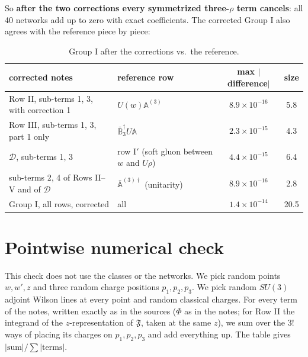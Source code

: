 \documentclass[10pt]{article}
\numberwithin{equation}{section}
\begin{document}
\medskip
So \textbf{after the two corrections every symmetrized three-$\rho$ term cancels}: all 40 networks add up to zero with exact coefficients. The corrected Group I also agrees with the reference piece by piece:

\begin{table}[h]
\centering\small
\begin{tabular}{@{}l l c c@{}}
corrected notes & reference row & max $|$difference$|$ & size\\ \hline
Row II, sub-terms 1, 3, with correction 1 & $U(w)\mathbb A^{(3)}$ & $8.9\times10^{-16}$ & 5.8\\
Row III, sub-terms 1, 3, part 1 only & $\bar{\mathbb B}_3^\dagger U\mathbb A$ & $2.3\times10^{-15}$ & 4.3\\
$\mathcal D$, sub-terms 1, 3 & row I$'$ (soft gluon between $w$ and $U\rho$) & $4.4\times10^{-15}$ & 6.4\\
sub-terms 2, 4 of Rows II--V and of $\mathcal D$ & $\bar{\mathbb A}^{(3)\dagger}$ (unitarity) & $8.9\times10^{-16}$ & 2.8\\
Group I, all rows, corrected & all & $1.4\times10^{-14}$ & 20.5\\
\end{tabular}
\caption{Group I after the corrections vs.\ the reference.}
\label{C:tab:after}
\end{table}


\section{Pointwise numerical check}\label{C:sec:pointwise}

This check does not use the classes or the networks. We pick random points $w,w',z$ and three random charge positions $p_1,p_2,p_3$. We pick random $SU(3)$ adjoint Wilson lines at every point and random classical charges. For every term of the notes, written exactly as in the sources ($\Phi$ as in the notes; for Row II the integrand of the $z$-representation of $\mathfrak F$, taken at the same $z$), we sum over the $3!$ ways of placing its charges on $p_1,p_2,p_3$ and add everything up. The table gives $|\text{sum}|/\sum|\text{terms}|$.
\end{document}
